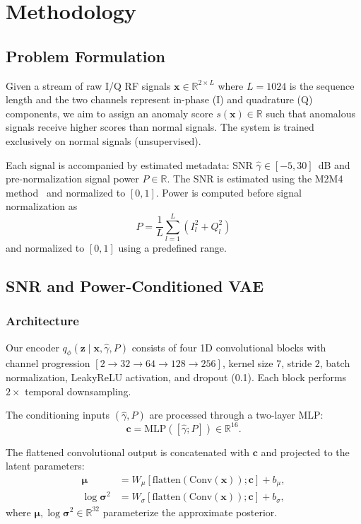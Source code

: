 \documentclass[conference]{IEEEtran}
\begin{document}
\section{Methodology}
\subsection{Problem Formulation}
Given a stream of raw I/Q RF signals $\mathbf{x} \in \mathbb{R}^{2 \times L}$ where $L=1024$ is the sequence length and the two channels represent in-phase (I) and quadrature (Q) components, we aim to assign an anomaly score $s(\mathbf{x}) \in \mathbb{R}$ such that anomalous signals receive higher scores than normal signals. The system is trained exclusively on normal signals (unsupervised).

Each signal is accompanied by estimated metadata: SNR $\hat{\gamma} \in [-5, 30]$~dB and pre-normalization signal power $P \in \mathbb{R}$. The SNR is estimated using the M2M4 method~\cite{pauluzzi2000} and normalized to $[0,1]$. Power is computed before signal normalization as
\begin{equation}
P = \frac{1}{L}\sum_{l=1}^{L}\left(I_l^2 + Q_l^2\right)
\end{equation}
and normalized to $[0,1]$ using a predefined range.

\subsection{SNR and Power-Conditioned VAE}
\subsubsection{Architecture}
Our encoder $q_{\phi}(\mathbf{z}\mid \mathbf{x}, \hat{\gamma}, P)$ consists of four 1D convolutional blocks with channel progression $[2 \rightarrow 32 \rightarrow 64 \rightarrow 128 \rightarrow 256]$, kernel size $7$, stride $2$, batch normalization, LeakyReLU activation, and dropout (0.1). Each block performs $2\times$ temporal downsampling.

The conditioning inputs $(\hat{\gamma}, P)$ are processed through a two-layer MLP:
\begin{equation}
\mathbf{c} = \mathrm{MLP}([\hat{\gamma}; P]) \in \mathbb{R}^{16}.
\end{equation}

The flattened convolutional output is concatenated with $\mathbf{c}$ and projected to the latent parameters:
\begin{align}
\boldsymbol{\mu} &= W_{\mu}[\mathrm{flatten}(\mathrm{Conv}(\mathbf{x})); \mathbf{c}] + b_{\mu},\\
\log \boldsymbol{\sigma}^2 &= W_{\sigma}[\mathrm{flatten}(\mathrm{Conv}(\mathbf{x})); \mathbf{c}] + b_{\sigma},
\end{align}
where $\boldsymbol{\mu}, \log \boldsymbol{\sigma}^2 \in \mathbb{R}^{32}$ parameterize the approximate posterior.
\end{document}
